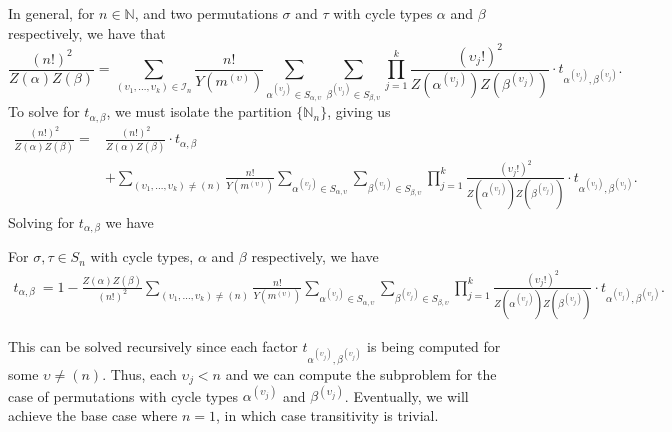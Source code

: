 In general, for $n\in\mathbb{N}$, and two permutations $\sigma$
and $\tau$ with cycle types $\alpha$ and $\beta$ respectively, we have that
\[
  \frac{(n!)^2}{Z(\alpha)Z(\beta)} =
  \sum_{(\upsilon_1,\dots,\upsilon_k)\in\mathcal{I}_n}\frac{n!}{Y(m^{(\upsilon)})}\sum_{\alpha^{(\upsilon_j)}\in
  S_{\alpha,\upsilon}}\sum_{\beta^{(\upsilon_j)}\in
  S_{\beta,\upsilon}}\prod_{j=1}^k
  {\frac{(\upsilon_j!)^2}{Z(\alpha^{(\upsilon_j)})Z(\beta^{(\upsilon_j)})}}\cdot
  t_{\alpha^{(\upsilon_j)},\beta^{(\upsilon_j)}}.
\]
To solve for $t_{\alpha,\beta}$, we must isolate the partition
$\{\mathbb{N}_n\}$, giving us
\begin{align*}
  \frac{(n!)^2}{Z(\alpha)Z(\beta)} =
  &\frac{(n!)^2}{Z(\alpha)Z(\beta)}\cdot t_{\alpha, \beta}\\
  &+
  \sum_{(\upsilon_1,\dots,\upsilon_k)\ne(n)}\frac{n!}{Y(m^{(\upsilon)})}\sum_{\alpha^{(\upsilon_j)}\in
  S_{\alpha,\upsilon}}\sum_{\beta^{(\upsilon_j)}\in
  S_{\beta,\upsilon}}\prod_{j=1}^k
  {\frac{(\upsilon_j!)^2}{Z(\alpha^{(\upsilon_j)})Z(\beta^{(\upsilon_j)})}}\cdot
  t_{\alpha^{(\upsilon_j)},\beta^{(\upsilon_j)}}.
\end{align*}
Solving for $t_{\alpha,\beta}$ we have
\begin{theorem}\label{general_dixon}
  For $\sigma,\tau\in S_n$ with cycle types, $\alpha$ and $\beta$
  respectively, we have
  \begin{align*}
    t_{\alpha, \beta}\ = 1 -
    \frac{Z(\alpha)Z(\beta)}{(n!)^2}\sum_{(\upsilon_1,\dots,\upsilon_k)\ne(n)}\frac{n!}{Y(m^{(\upsilon)})}\sum_{\alpha^{(\upsilon_j)}\in
    S_{\alpha,\upsilon}}\sum_{\beta^{(\upsilon_j)}\in
    S_{\beta,\upsilon}}\prod_{j=1}^k
    {\frac{(\upsilon_j!)^2}{Z(\alpha^{(\upsilon_j)})Z(\beta^{(\upsilon_j)})}}\cdot
    t_{\alpha^{(\upsilon_j)},\beta^{(\upsilon_j)}}.
  \end{align*}
\end{theorem}
\noindent This can be solved recursively since each factor
$t_{\alpha^{(\upsilon_j)},\beta^{(\upsilon_j)}}$ is being computed for
some $\upsilon \ne (n)$. Thus, each $\upsilon_j < n$ and we can
compute the subproblem for the case of permutations with cycle types
$\alpha^{(\upsilon_j)}$ and $\beta^{(\upsilon_j)}$. Eventually, we will
achieve the base case where $n = 1$, in which case transitivity is trivial.
